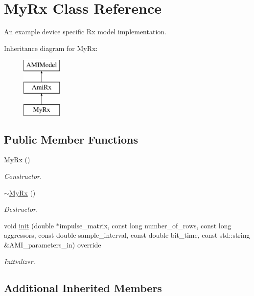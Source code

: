 \hypertarget{class_my_rx}{}\section{My\+Rx Class Reference}
\label{class_my_rx}


An example device specific Rx model implementation.  


Inheritance diagram for My\+Rx\+:\begin{figure}[H]
\begin{center}
\leavevmode
\includegraphics[height=3.000000cm]{class_my_rx}
\end{center}
\end{figure}
\subsection*{Public Member Functions}
\begin{DoxyCompactItemize}
\item 
\hyperlink{class_my_rx_a15ae23287355c2bfbdb192da7af7f043}{My\+Rx} ()
\begin{DoxyCompactList}\small\item\em Constructor. \end{DoxyCompactList}\item 
\hyperlink{class_my_rx_a7e347a66aec3f7f14f5b44659d9f98e6}{$\sim$\+My\+Rx} ()
\begin{DoxyCompactList}\small\item\em Destructor. \end{DoxyCompactList}\item 
void \hyperlink{class_my_rx_a3e517d6be1e6a475bd97ae75b2bd0afc}{init} (double $\ast$impulse\+\_\+matrix, const long number\+\_\+of\+\_\+rows, const long aggressors, const double sample\+\_\+interval, const double bit\+\_\+time, const std\+::string \&A\+M\+I\+\_\+parameters\+\_\+in) override
\begin{DoxyCompactList}\small\item\em Initializer. \end{DoxyCompactList}\end{DoxyCompactItemize}
\subsection*{Additional Inherited Members}



